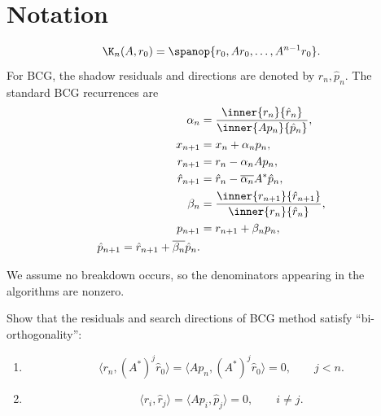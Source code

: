 \documentclass{ctexart}
\newif\ifpreface
\begin{document}
\large
\setlength{\baselineskip}{1.2em}
\ifpreface

\newgeometry{left=2cm,right=2cm,top=2cm,bottom=2cm}
\else
{}
\maketitle
\fi

\section*{Notation}
\[
  \K_n(A,r_0)=\spanop\{r_0,Ar_0,\ldots,A^{n-1}r_0\}.
\]
For BCG, the shadow residuals and directions are denoted by $\hat r_n,\hat p_n$.  The standard BCG recurrences are
\begin{equation}
  \begin{aligned}
    \alpha_n &= \frac{\inner{r_n}{\hat r_n}}{\inner{A p_n}{\hat p_n}},\\
    x_{n+1} &= x_n+\alpha_n p_n,\\
    r_{n+1}&=r_n-\alpha_n A p_n,\\
    \hat r_{n+1}&=\hat r_n-\overline{\alpha_n}A^*\hat p_n,\\
    \beta_n&=\frac{\inner{r_{n+1}}{\hat r_{n+1}}}{\inner{r_n}{\hat r_n}},\\
    p_{n+1}&=r_{n+1}+\beta_n p_n,\\
    \hat p_{n+1}=\hat r_{n+1}+\overline{\beta_n}\hat p_n.
  \end{aligned}
\end{equation}

We assume no breakdown occurs, so the denominators appearing in the algorithms are nonzero.

\begin{problem}\label{pro:1}
  Show that the residuals and search directions of BCG method satisfy ``bi-orthogonality'':

  \begin{enumerate}[label=(\alph*)]
    \item
      \[
        \langle r_n,(A^*)^j \hat r_0 \rangle
        =
        \langle Ap_n,(A^*)^j \hat r_0 \rangle
        =0,
        \qquad j<n.
      \]

    \item
      \[
        \langle r_i,\hat r_j\rangle
        =
        \langle Ap_i,\hat p_j\rangle
        =0,
        \qquad i\neq j.
      \]
  \end{enumerate}
\end{problem}
\end{document}
